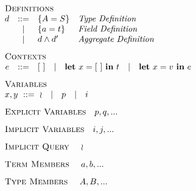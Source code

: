 \begin{minipage}[t]{.4\textwidth}\[\begin{array}{r c l l}
    \multicolumn{4}{l}{\textsc{Definitions}}                  \\
    d & ::= & \DEF{A}{S}      & \textit{Type Definition     } \\
      &  |  & \DEF{a}{t}      & \textit{Field Definition    } \\
      &  |  & \AGG{d}{d'}     & \textit{Aggregate Definition} \\[3mm]
    \multicolumn{4}{l}{\textsc{Contexts}} \\
    e & ::= & \multicolumn{2}{l}{\HOL
        \quad | \quad \LET{x}{\HOL}{t}
        \quad | \quad \LET{x}{v}{e}} \\[3mm]
    \multicolumn{4}{l}{\textsc{Variables}} \\
    \multicolumn{4}{l}{x, y\ ::=\ \IMP \quad | \quad p \quad | \quad i} \\[3mm]
    \multicolumn{4}{l}{\textsc{Explicit Variables} \quad p, q, ...} \\[3mm]
    \multicolumn{4}{l}{\textsc{Implicit Variables} \quad i, j, ...} \\[3mm]
    \multicolumn{4}{l}{\textsc{Implicit Query    } \quad \IMP     } \\[3mm]
    \multicolumn{4}{l}{\textsc{Term Members      } \quad a, b, ...} \\[3mm]
    \multicolumn{4}{l}{\textsc{Type Members      } \quad A, B, ...} \\[3mm]
\end{array}\]\end{minipage}
